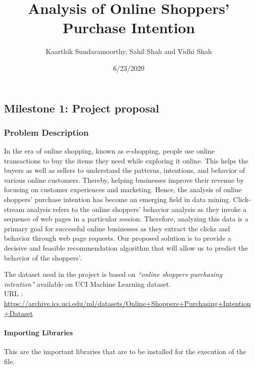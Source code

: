 \documentclass[
]{article}
\title{Analysis of Online Shoppers' Purchase Intention}
\author{Kaarthik Sundaramoorthy, Sahil Shah and Vidhi Shah}
\date{6/23/2020}
\begin{document}
\maketitle

\hypertarget{milestone-1-project-proposal}{%
\subsection{\texorpdfstring{\center Milestone 1: Project proposal
\center }{Milestone 1: Project proposal }}\label{milestone-1-project-proposal}}

\hypertarget{problem-description}{%
\subsubsection{Problem Description}\label{problem-description}}

In the era of online shopping, known as e-shopping, people use online
transactions to buy the items they need while exploring it online. This
helps the buyers as well as sellers to understand the patterns,
intentions, and behavior of various online customers. Thereby, helping
businesses improve their revenue by focusing on customer experiences and
marketing. Hence, the analysis of online shoppers' purchase intention
has become an emerging field in data mining. Click-stream analysis
refers to the online shoppers' behavior analysis as they invoke a
sequence of web pages in a particular session. Therefore, analyzing this
data is a primary goal for successful online businesses as they extract
the clicks and behavior through web page requests. Our proposed solution
is to provide a decisive and feasible recommendation algorithm that will
allow us to predict the behavior of the shoppers'.

The dataset used in the project is based on \emph{``online shoppers
purchasing intention''} available on UCI Machine Learning dataset.\\

URL :
\url{https://archive.ics.uci.edu/ml/datasets/Online+Shoppers+Purchasing+Intention+Dataset}

\hypertarget{importing-libraries}{%
\paragraph{\texorpdfstring{Importing Libraries\\
}{Importing Libraries }}\label{importing-libraries}}

This are the important libraries that are to be installed for the
execution of the file.
\end{document}
